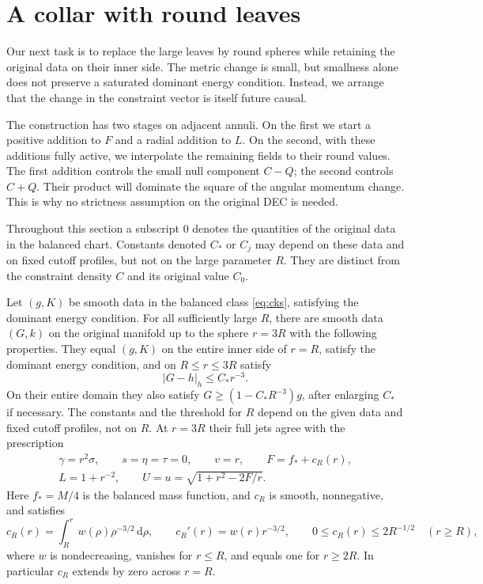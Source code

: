 \section{A collar with round leaves}\label{sec:collar}

Our next task is to replace the large leaves by round spheres while
retaining the original data on their inner side. The metric change is
small, but smallness alone does not preserve a saturated dominant energy
condition. Instead, we arrange that the change in the constraint vector
is itself future causal.

The construction has two stages on adjacent annuli. On the first we
start a positive addition to $F$ and a radial addition to $L$. On the
second, with these additions fully active, we interpolate the remaining
fields to their round values. The first addition controls the small
null component $C-Q$; the second controls $C+Q$. Their product will
dominate the square of the angular momentum change. This is why no
strictness assumption on the original DEC is needed.

Throughout this section a subscript $0$ denotes the quantities of the
original data in the balanced chart. Constants denoted $C_*$ or $C_j$
may depend on these data and on fixed cutoff profiles, but not on the
large parameter $R$. They are distinct from the constraint density $C$
and its original value $C_0$.

\begin{lemma}\label{lem:collar}
Let $(g,K)$ be smooth data in the balanced class \eqref{eq:cks},
satisfying the dominant energy condition. For all sufficiently large
$R$, there are smooth data $(G,k)$ on the original manifold up to the
sphere $r=3R$ with the following properties.
They equal $(g,K)$ on the entire inner side of $r=R$, satisfy the dominant
energy condition, and on $R\leq r\leq3R$ satisfy
\[
 |G-h|_h\leq C_* r^{-3}.
\]
On their entire domain they also satisfy
$G\geq(1-C_*R^{-3})g$, after enlarging $C_*$ if necessary.
The constants and the threshold for $R$ depend on the given data and
fixed cutoff profiles, not on $R$.
At $r=3R$ their full jets agree with the prescription
\[
\begin{gathered}
 \gamma=r^2\sigma,\qquad s=\eta=\tau=0,\qquad
 v=r,\qquad F=f_*+c_R(r),\\
 L=1+r^{-2},\qquad U=u=\sqrt{1+r^2-2F/r}.
\end{gathered}
\]
Here $f_*=M/4$ is the balanced mass function, and $c_R$ is smooth,
nonnegative, and satisfies
\begin{equation}\label{eq:mass-padding}
 c_R(r)=\int_R^r w(\rho)\rho^{-3/2}\,\mathrm d\rho,
 \qquad c_R'(r)=w(r)r^{-3/2},\qquad
 0\leq c_R(r)\leq2R^{-1/2}\quad(r\geq R),
\end{equation}
where $w$ is nondecreasing, vanishes for $r\leq R$, and equals one for
$r\geq2R$.  In particular $c_R$ extends by zero across $r=R$.
\end{lemma}

